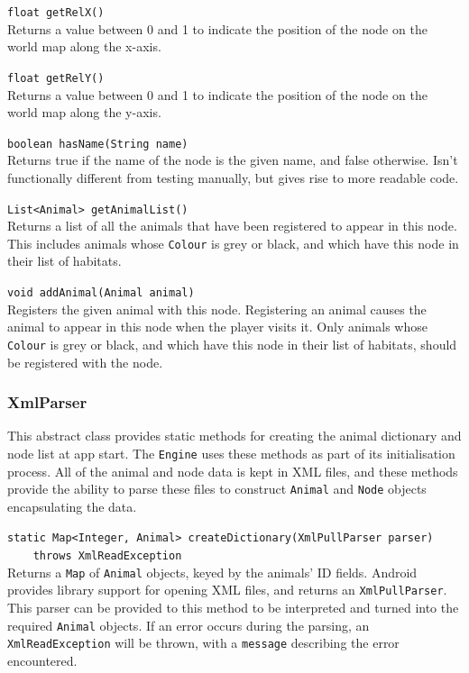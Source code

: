 \documentclass[12pt,a4paper,twoside]{article}
\begin{document}
\verb|float getRelX()|\\
Returns a value between 0 and 1 to indicate the position of the node on the world map along the x-axis.

\verb|float getRelY()|\\
Returns a value between 0 and 1 to indicate the position of the node on the world map along the y-axis.

\verb|boolean hasName(String name)|\\
Returns true if the name of the node is the given name, and false otherwise. Isn't functionally different from testing manually, but gives rise to more readable code.

\verb|List<Animal> getAnimalList()|\\
Returns a list of all the animals that have been registered to appear in this node. This includes animals whose \verb|Colour| is grey or black, and which have this node in their list of habitats.

\verb|void addAnimal(Animal animal)|\\
Registers the given animal with this node. Registering an animal causes the animal to appear in this node when the player visits it. Only animals whose \verb|Colour| is grey or black, and which have this node in their list of habitats, should be registered with the node.

\subsubsection{XmlParser}

This abstract class provides static methods for creating the animal dictionary and node list at app start. The \verb|Engine| uses these methods as part of its initialisation process. All of the animal and node data is kept in XML files, and these methods provide the ability to parse these files to construct \verb|Animal| and \verb|Node| objects encapsulating the data.

\verb|static Map<Integer, Animal> createDictionary(XmlPullParser parser)|\\
\verb|    throws XmlReadException|\\
Returns a \verb|Map| of \verb|Animal| objects, keyed by the animals' ID fields. Android provides library support for opening XML files, and returns an \verb|XmlPullParser|. This parser can be provided to this method to be interpreted and turned into the required \verb|Animal| objects. If an error occurs during the parsing, an \verb|XmlReadException| will be thrown, with a \verb|message| describing the error encountered.
\end{document}
